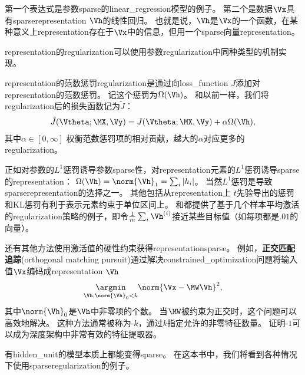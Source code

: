 
第一个表达式是参数\gls{sparse}的\gls{linear_regression}模型的例子。
第二个是数据$\Vx$具有\gls{sparse}\gls{representation} $\Vh$的线性回归。
也就是说，$\Vh$是$\Vx$的一个函数，在某种意义上\gls{representation}存在于$\Vx$中的信息，但用一个\gls{sparse}向量\gls{representation}。

\gls{representation}的\gls{regularization}可以使用参数\gls{regularization}中同种类型的机制实现。

\gls{representation}的范数惩罚\gls{regularization}是通过向\gls{loss_function} $J$添加对\gls{representation}的范数惩罚。
记这个惩罚为$\Omega(\Vh)$。
和以前一样，我们将\gls{regularization}后的损失函数记为$\tilde J$：
\begin{align}
 \tilde J(\Vtheta; \MX, \Vy) =  J(\Vtheta; \MX, \Vy)  + \alpha \Omega(\Vh),
\end{align}
其中$\alpha \in [0, \infty]$ 权衡范数惩罚项的相对贡献，越大的$\alpha$对应更多的\gls{regularization}。

正如对参数的$L^1$惩罚诱导参数\gls{sparse}性，对\gls{representation}元素的$L^1$惩罚诱导\gls{sparse}的\gls{representation}：
$\Omega(\Vh) = \norm{\Vh}_1 = \sum_i |h_i|$。
当然$L^1$惩罚是导致\gls{sparse}\gls{representation}的选择之一。
其他包括从\gls{representation}上 $t$先验导出的惩罚\citep{Olshausen+Field-1996,Bergstra-Phd-2011}和\gls{KL}惩罚\citep{Larochelle+Bengio-2008}有利于表示元素约束于单位区间上。
\cite{HonglakL2008-small}和\cite{Goodfellow2009}都提供了基于几个样本平均激活的\gls{regularization}策略的例子，即令$\frac{1}{m}\sum_i \Vh^{(i)}$接近某些目标值（如每项都是$.01$的向量）。

还有其他方法使用激活值的硬性约束获得\gls{representation}\gls{sparse}。
例如，\textbf{正交匹配追踪}(orthogonal matching pursuit)\citep{pati93orthogonal}通过解决\gls{constrained_optimization}问题将输入值$\Vx$编码成\gls{representation} $\Vh$
\begin{align}
 \underset{\Vh, \norm{\Vh}_0 < k}{\argmin} \norm{\Vx - \MW \Vh}^2,
\end{align}
其中$\norm{\Vh}_0 $是$\Vh$中非零项的个数。
当$\MW$被约束为正交时，这个问题可以高效地解决。
这种方法通常被称为-$k$，通过$k$指定允许的非零特征数量。
\cite{Coates2011b}证明-$1$可以成为深度架构中非常有效的特征提取器。


有\gls{hidden_unit}的模型本质上都能变得\gls{sparse}。
在这本书中，我们将看到各种情况下使用\gls{sparse}\gls{regularization}的例子。

